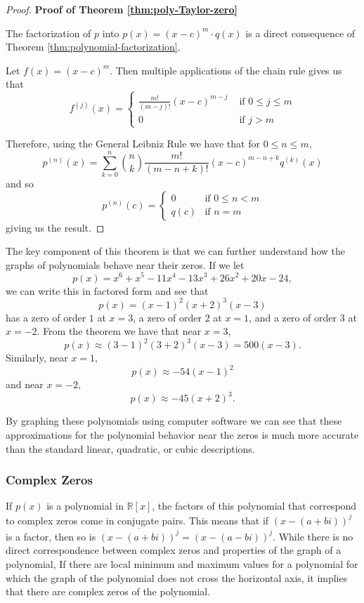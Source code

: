 \documentclass[
]{book}
\theoremstyle{definition}
\theoremstyle{definition}
\theoremstyle{definition}
\theoremstyle{remark}
\begin{document}
\begin{proof}
{}\textbf{Proof of Theorem \ref{thm:poly-Taylor-zero}}

The factorization of \(p\) into \(p(x)=(x-c)^m \cdot q(x)\) is a direct consequence of Theorem \ref{thm:polynomial-factorization}.

Let \(f(x)=(x-c)^m\). Then multiple applications of the chain rule gives us that
\[f^{(j)}(x) = \begin{cases}
 \frac{m!}{(m-j)!} (x-c)^{m-j} & \mbox{ if } 0 \leq j \leq m \\
0 & \mbox{ if } j>m 
\end{cases}\]

Therefore, using the General Leibniz Rule we have that for \(0\leq n \leq m\),
\[p^{(n)}(x) = \sum_{k=0}^n \binom{n}{k} \frac{m!}{(m-n+k)!} (x-c)^{m-n+k} q^{(k)}(x)\] and so
\[p^{(n)}(c) = 
\begin{cases}
0 & \mbox{if } 0 \leq n < m\\
q(c) & \mbox{if } n=m   
\end{cases}\]
giving us the result.
\end{proof}

The key component of this theorem is that we can further understand how the graphs of polynomials behave near their zeros. If we let \[p(x)=x^6+x^5-11x^4-13x^3+26x^2+20x-24,\] we can write this in factored form and see that \[p(x)=(x-1)^2(x+2)^3(x-3)\] has a zero of order \(1\) at \(x=3\), a zero of order \(2\) at \(x=1\), and a zero of order \(3\) at \(x=-2\). From the theorem we have that near \(x=3\), \[p(x) \approx (3-1)^2(3+2)^3(x-3) = 500 (x-3).\] Similarly, near \(x=1\), \[p(x) \approx -54 (x-1)^2\] and near \(x=-2\), \[p(x)\approx -45 (x+2)^3.\]

By graphing these polynomials using computer software we can see that these approximations for the polynomial behavior near the zeros is much more accurate than the standard linear, quadratic, or cubic descriptions.

\hypertarget{complex-zeros}{%
\subsubsection{Complex Zeros}\label{complex-zeros}}

If \(p(x)\) is a polynomial in \(\mathbb{R}[x]\), the factors of this polynomial that correspond to complex zeros come in conjugate pairs. This means that if \((x-(a+bi))^j\) is a factor, then so is \(\overline{(x-(a+bi))^j}= (x-(a-bi))^j\). While there is no direct correspondence between complex zeros and properties of the graph of a polynomial, If there are local minimum and maximum values for a polynomial for which the graph of the polynomial does not cross the horizontal axis, it implies that there are complex zeros of the polynomial.
\end{document}
